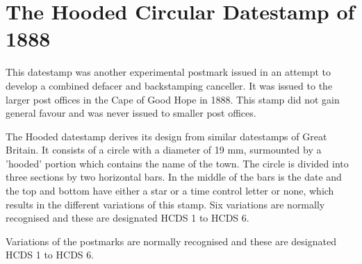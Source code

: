\section{The Hooded Circular Datestamp of 1888}



This datestamp was another experimental postmark issued in an attempt to 
develop a combined defacer and backstamping canceller. It was issued 
to the larger post offices in the Cape of Good Hope in 1888. This 
stamp did not gain general favour and was never issued to 
smaller post offices.

The Hooded datestamp derives its design from similar datestamps 
of Great Britain. It consists of a circle with a diameter of 19 mm, 
surmounted by a 'hooded' portion which contains the name of the town. 
The circle is divided into three sections by two horizontal bars. 
In the middle of the bars is the date and the top and bottom have 
either a star or a time control letter or none, which results in 
the different variations of this stamp. Six variations are 
normally recognised and these are designated HCDS 1 to HCDS 6. 

Variations of the postmarks are normally recognised and these are 
designated \textsc{HCDS 1} to \textsc{HCDS 6}. 

\begin{comment}
<table align="center" cellpadding="2" cellspacing="0" width="579" border="0">
   <tbody>
  <tr>
   <td width="151"><img src="http://localhost/capepostalhistory/SQUARE-CIRCLE/HCDS/HCDS.jpg" alt="HCDS1" height="130" width="151"></td>
   
   <td width="158"><img src="http://localhost/capepostalhistory/SQUARE-CIRCLE/HCDS/HCDS.jpg" alt="HCDS 2" height="130" width="151"></td>
   
   
   <td width="127"><img src="http://localhost/capepostalhistory/SQUARE-CIRCLE/HCDS/HCDS.jpg" alt="HCDS 2" height="130" width="151"></td>
   <td width="133"><img src="http://localhost/capepostalhistory/SQUARE-CIRCLE/HCDS/HCDS.jpg" alt="HCDS 2" height="130" width="151"></td>
  </tr>

  <tr>
                <td><div style="font-weight: bold;" align="center">HCDS 1 </div></td>
                <td><div style="font-weight: bold;" align="center">HCDS 2 </div></td>
                <td><div style="font-weight: bold;" align="center">HCDS 3 </div></td>
                <td><div style="font-weight: bold;" align="center">HCDS 5 </div></td>
  </tr>
  <tr>

                <td><div style="color: rgb(0, 0, 255);" align="center"><span class="ImageDescription" style="font-style: italic;">Star on top, control letter belo</span><span class="ImageDescription">w </span></div></td>
                <td>Vice versa to HCDS 1 </td>
                <td><div align="center">Control letter in the Upper portion and blank below. HCDS 4 is vice versa to this. </div></td>
                <td><div align="center">Blank on top star at bottom. HCDS 6 is vice versa to HCDS 5 </div></td>
  </tr>
  </tbody>
</table>
\end{comment}
                                                          